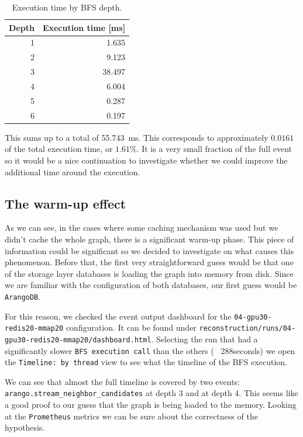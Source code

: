 \documentclass[11pt,a4paper]{article}
\begin{document}
\begin{table}[H]
    \centering
    \caption{Execution time by BFS depth.}
    \label{tab:bfs-depth-times}

    \begin{tabular}{rr}
        \hline
        \textbf{Depth} & \textbf{Execution time [ms]} \\
        \hline
        1 & 1.635  \\
        2 & 9.123  \\
        3 & 38.497 \\
        4 & 6.004  \\
        5 & 0.287  \\
        6 & 0.197  \\
        \hline
    \end{tabular}
\end{table}

This sums up to a total of \SI{55.743}{\milli\second}. This corresponds to approximately \(0.0161\) of the total execution time, or \(1.61\%\). It is a very small fraction of the full event so it would be a nice continuation to investigate whether we could improve the additional time around the execution.

\subsection{The warm-up effect}

As we can see, in the cases where some caching mechanism was used but we didn't cache the whole graph, there is a significant warm-up phase.  This piece of information could be significant so we decided to investigate on what causes this phenomenon. Before that, the first very straightforward guess would be that one of the storage layer databases is loading the graph into memory from disk. Since we are familiar with the configuration of both databases, our first guess would be \texttt{ArangoDB}. 

For this reason, we checked the event output dashboard for the \texttt{04-gpu30-redis20-mmap20} configuration. It can be found under \texttt{reconstruction/runs/04-gpu30-redis20-mmap20/dashboard.html}. Selecting the run that had a significantly slower \texttt{BFS execution call} than the others (~ 288seconds) we open the \texttt{Timeline: by thread} view to see what the timeline of the BFS execution.

We can see that almost the full timeline is covered by two events: \texttt{arango.stream\_neighbor\_candidates} at depth 3 and at depth 4. This seems like a good proof to our guess that the graph is being loaded to the memory. Looking at the \texttt{Prometheus} metrics we can be sure about the correctness of the hypothesis. 
\end{document}
